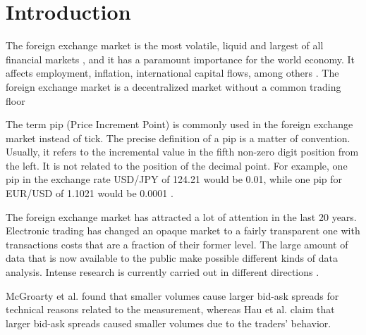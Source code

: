 \section{Introduction}\label{sec:introduction}

The foreign exchange market is the most volatile, liquid and largest of all
financial markets
\cite{forex_liquidity,info_forex,forex_market_micro,intraday_forex}, and it has
a paramount importance for the world economy. It affects employment, inflation,
international capital flows, among others \cite{forex_structure}. The foreign
exchange market is a decentralized market without a common trading floor
\cite{teach_spread,forex_structure,info_forex,forex_market_micro}

The term pip (Price Increment Point) is commonly used in the foreign exchange
market instead of tick. The precise definition of a pip is a matter of
convention. Usually, it refers to the incremental value in the fifth non-zero
digit position from the left. It is not related to the position of the decimal
point. For example, one pip in the exchange rate USD/JPY of 124.21 would be
0.01, while one pip for EUR/USD of 1.1021 would be 0.0001
\cite{order_flow_forex,forex_structure,micro_eff,forex_market_micro}.

The foreign exchange market has attracted a lot of attention in the last 20
years. Electronic trading has changed an opaque market to a fairly transparent
one with transactions costs that are a fraction of their former level. The
large amount of data that is now available to the public make possible
different kinds of data analysis. Intense research is currently carried out in
different directions
\cite{curr_speculation,forex_algorithmic,teach_spread,electronic_forex,forex_microstructure,patterns_forex,eur_change_forex,spread_competition,forex_structure,political_forex,forex_liquidity,forex_volatility,info_forex,local_forex,intraday_forex,forex_inefficiency}.

McGroarty et al. \cite{micro_eff} found that smaller volumes cause larger
bid-ask spreads for technical reasons related to the measurement, whereas Hau
et al. \cite{eur_int_curr,eur_change_forex} claim that larger bid-ask spreads
caused smaller volumes due to the traders' behavior.

